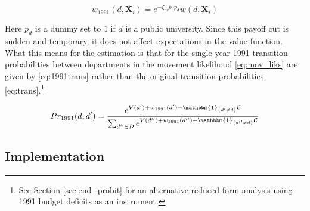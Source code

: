 \begin{equation}
    w_{1991}(d, \mathbf{X}_i) = e^{- \xi_{ex} b_d p_d} w(d, \mathbf{X}_i)
    \label{eq:exog_var}
\end{equation}

Here $p_d$ is a dummy set to $1$ if $d$ is a public university.  Since this payoff
cut is sudden and temporary, it does not affect
expectations in the value function.  What this means for the estimation is that
for the single year 1991 transition probabilities between departments 
in the movement likelihood \eqref{eq:mov_liks} are given by \eqref{eq:1991trans} rather than
the original transition probabilities \eqref{eq:trans}.\footnote{See Section \ref{sec:end_probit} for an alternative
reduced-form analysis using 1991 budget deficits as an instrument.}

\begin{equation}
    Pr_{1991}(d,d') = \frac{e^{V(d') + w_{1991}(d') - \mathbbm{1}_{\{d'\neq d\}}\mathcal{C}}}{\sum_{d'' \in \mathcal{D}} e^{V(d'') + w_{1991}(d'') - \mathbbm{1}_{\{d''\neq d\}} \mathcal{C}}}
    \label{eq:1991trans}
\end{equation}

\subsection{Implementation}

